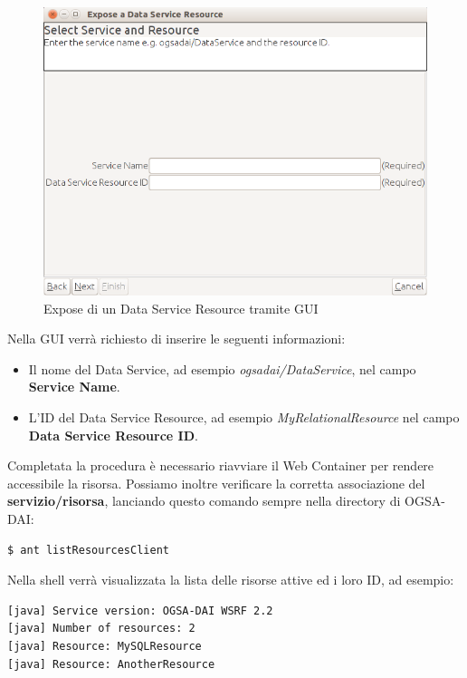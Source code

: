 \documentclass[11pt]{article}
\begin{document}
\begin{figure}[H]
	\centering
	\includegraphics[scale=0.9]{images/guiexpose.png}
	\caption{Expose di un Data Service Resource tramite GUI}
	\label{guiexpose}
\end{figure}

Nella GUI verrà richiesto di inserire le seguenti informazioni: 

\begin{itemize}
	\item Il nome del Data Service, ad esempio \emph{ogsadai/DataService}, nel campo \textbf{Service Name}.
	\item L'ID del Data Service Resource, ad esempio \emph{MyRelationalResource} nel campo \textbf{Data Service Resource ID}.
\end{itemize}

Completata la procedura è necessario riavviare il Web Container per rendere accessibile la risorsa. Possiamo inoltre verificare la corretta associazione del \textbf{servizio/risorsa}, lanciando questo comando sempre nella directory di OGSA-DAI:

\begin{lstlisting}[language=bash]
$ ant listResourcesClient
\end{lstlisting}

Nella shell verrà visualizzata la lista delle risorse attive ed i loro ID, ad esempio: 
\begin{lstlisting}[language=bash]
[java] Service version: OGSA-DAI WSRF 2.2
[java] Number of resources: 2
[java] Resource: MySQLResource
[java] Resource: AnotherResource

\end{lstlisting}
\end{document}
